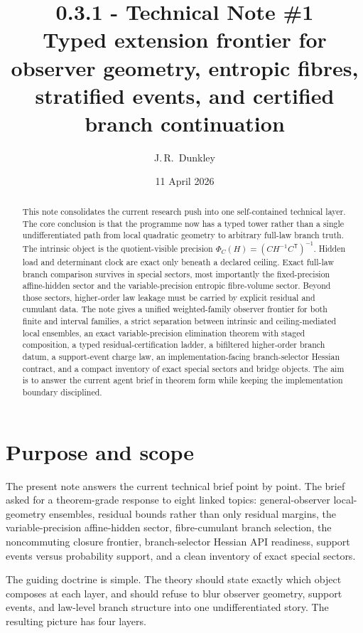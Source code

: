 \documentclass[11pt,a4paper]{article}
\title{\textbf{0.3.1 - Technical Note \#1}\\
\large{Typed extension frontier for observer geometry, entropic fibres, stratified events, and certified branch continuation}}
\author{J.\,R.~Dunkley}
\date{11 April 2026}
\numberwithin{equation}{section}
\theoremstyle{thmcompact}
\theoremstyle{remark}
\begin{document}
\maketitle

\begin{abstract}
This note consolidates the current research push into one self-contained technical layer. The core conclusion is that the programme now has a typed tower rather than a single undifferentiated path from local quadratic geometry to arbitrary full-law branch truth. The intrinsic object is the quotient-visible precision $\Phi_C(H)=(CH^{-1}C^{\mathsf T})^{-1}$. Hidden load and determinant clock are exact only beneath a declared ceiling. Exact full-law branch comparison survives in special sectors, most importantly the fixed-precision affine-hidden sector and the variable-precision entropic fibre-volume sector. Beyond those sectors, higher-order law leakage must be carried by explicit residual and cumulant data. The note gives a unified weighted-family observer frontier for both finite and interval families, a strict separation between intrinsic and ceiling-mediated local ensembles, an exact variable-precision elimination theorem with staged composition, a typed residual-certification ladder, a bifiltered higher-order branch datum, a support-event charge law, an implementation-facing branch-selector Hessian contract, and a compact inventory of exact special sectors and bridge objects. The aim is to answer the current agent brief in theorem form while keeping the implementation boundary disciplined.
\end{abstract}

\section{Purpose and scope}

The present note answers the current technical brief point by point. The brief asked for a theorem-grade response to eight linked topics: general-observer local-geometry ensembles, residual bounds rather than only residual margins, the variable-precision affine-hidden sector, fibre-cumulant branch selection, the noncommuting closure frontier, branch-selector Hessian API readiness, support events versus probability support, and a clean inventory of exact special sectors.

The guiding doctrine is simple. The theory should state exactly which object composes at each layer, and should refuse to blur observer geometry, support events, and law-level branch structure into one undifferentiated story. The resulting picture has four layers.
\end{document}
